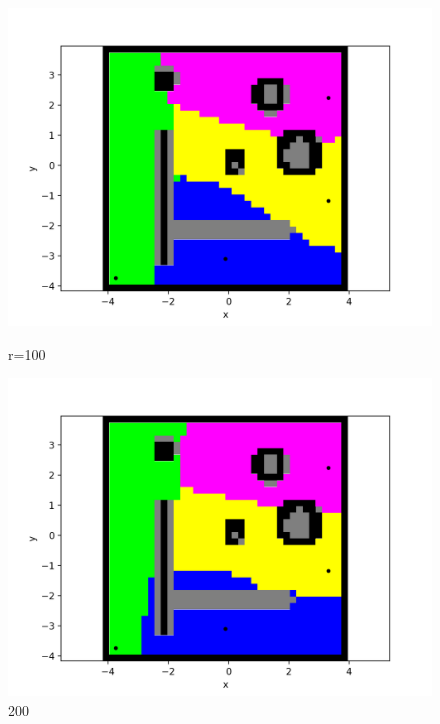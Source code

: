 \documentclass{beamer}
\begin{document}
\begin{frame}
\begin{figure}[H]
			\begin{minipage}{0.3\textwidth}{}
				\includegraphics[width=\linewidth]{DARPImages/100}
				\caption{r=100}
			\end{minipage}
			\hspace{\fill} %
			\begin{minipage}{0.3\textwidth}
				\includegraphics[width=\linewidth]{DARPImages/200}
				\caption{200}
			\end{minipage}
			\hspace{\fill} %
			\begin{minipage}{0.3\textwidth}

\end{minipage}
\end{figure}
\end{frame}
\end{document}
